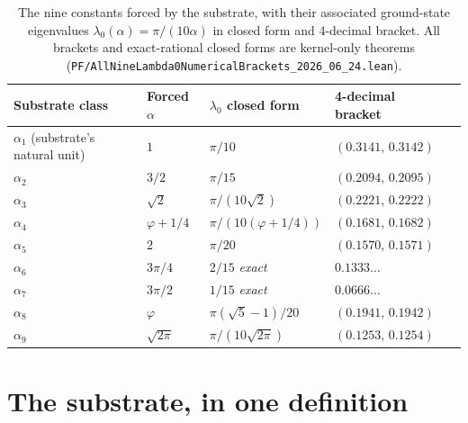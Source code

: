 \documentclass[11pt,a4paper]{amsart}
\theoremstyle{plain}
\theoremstyle{definition}
\begin{document}
\begin{table}[h]
\centering
\caption{The nine constants forced by the substrate, with their associated ground-state eigenvalues $\lambda_0(\alpha) = \pi/(10\alpha)$ in closed form and 4-decimal bracket. All brackets and exact-rational closed forms are kernel-only theorems (\texttt{PF/AllNineLambda0NumericalBrackets\_2026\_06\_24.lean}).}\label{tab:nine}
\begin{tabular}{lllll}
\toprule
Substrate class & Forced $\alpha$ & $\lambda_0$ closed form & 4-decimal bracket \\
\midrule
$\alpha_1$ (substrate's natural unit) & $1$            & $\pi/10$                 & $(0.3141,\,0.3142)$ \\
$\alpha_2$                            & $3/2$          & $\pi/15$                 & $(0.2094,\,0.2095)$ \\
$\alpha_3$                            & $\sqrt{2}$     & $\pi/(10\sqrt{2})$       & $(0.2221,\,0.2222)$ \\
$\alpha_4$                            & $\varphi+1/4$  & $\pi/(10(\varphi+1/4))$  & $(0.1681,\,0.1682)$ \\
$\alpha_5$                            & $2$            & $\pi/20$                 & $(0.1570,\,0.1571)$ \\
$\alpha_6$                            & $3\pi/4$       & $2/15$ \textit{exact}    & $0.1333\ldots$       \\
$\alpha_7$                            & $3\pi/2$       & $1/15$ \textit{exact}    & $0.0666\ldots$       \\
$\alpha_8$                            & $\varphi$      & $\pi(\sqrt{5}-1)/20$     & $(0.1941,\,0.1942)$ \\
$\alpha_9$                            & $\sqrt{2\pi}$  & $\pi/(10\sqrt{2\pi})$    & $(0.1253,\,0.1254)$ \\
\bottomrule
\end{tabular}
\end{table}

\section{The substrate, in one definition}\label{sec:substrate}
\end{document}
